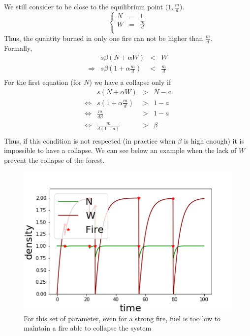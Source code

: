 \documentclass{article}
\begin{document}
We still consider to be close to the equilibrium point $(1, \frac{m}{d}$).
\[
\left\lbrace
\begin{array}{rcl}
     N & = & 1 \\
     W & = & \frac{m}{d} \\
\end{array}
\right.
\]
Thus, the quantity burned in only one fire can not be higher than $\frac{m}{d}$. \\
Formally,
\[
\begin{array}{crcl}
&s\beta(N+\alpha W) & < & W \\
\Rightarrow & s\beta(1+\alpha \frac{m}{d}) & < & \frac{m}{d} \\
\end{array}
\]
For the first equation (for $N$) we have a collapse only if
\[
\begin{array}{rccl}
                &  s(N+\alpha W) & > & N-a \\
\Leftrightarrow &  s(1+\alpha \frac{m}{d}) & > & 1-a \\ 
\Leftrightarrow &  \frac{m}{d\beta} & > & 1-a \\ 
\Leftrightarrow &  \frac{m}{d( 1-a)} & > & \beta \\ 
\end{array}
\]
Thus, if this condition is not respected (in practice when $\beta$ is high enough) it is impossible to have a collapse. We can see below  an example when the lack of $W$ prevent the collapse of the forest.


\newpage
\begin{figure}[h!]
\centering
\includegraphics[width=12cm]{return_never_1.png}
\caption{For this set of parameter, even for a strong fire, fuel is too low to maintain a fire able to collapse the system}
\end{figure}
\end{document}
